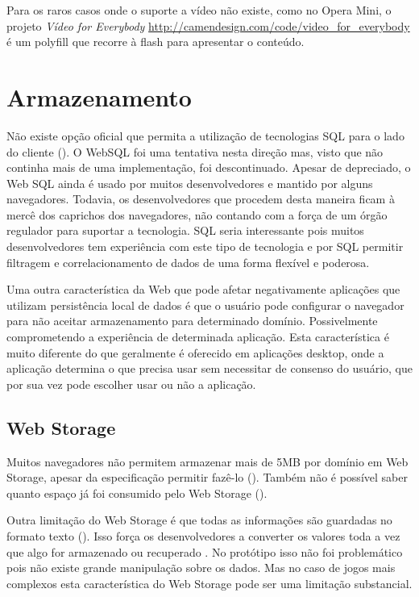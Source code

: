 Para os raros casos onde o suporte a vídeo não existe,
como no Opera Mini, o projeto \textit{Vídeo for Everybody}
\url{http://camendesign.com/code/video_for_everybody} é um polyfill que
recorre à flash para apresentar o conteúdo.

\section{Armazenamento}

Não existe opção oficial que permita a utilização de tecnologias
SQL para o lado do cliente (). O WebSQL foi uma
tentativa nesta direção mas, visto que não continha mais de uma
implementação, foi descontinuado. Apesar de depreciado, o Web SQL ainda
é usado por muitos desenvolvedores e mantido por alguns navegadores.
Todavia, os desenvolvedores que procedem desta maneira ficam à mercê
dos caprichos dos navegadores, não contando com a força de um
órgão regulador para suportar a tecnologia. SQL seria interessante pois
muitos desenvolvedores tem experiência com este tipo de tecnologia e
por SQL permitir filtragem e correlacionamento de dados de uma forma
flexível e poderosa.

Uma outra característica da Web que pode afetar negativamente
aplicações que utilizam  persistência local de dados é que o
usuário pode configurar o navegador para não aceitar armazenamento
para determinado domínio. Possivelmente comprometendo a experiência
de determinada aplicação. Esta característica é muito diferente do
que geralmente é oferecido em aplicações desktop, onde a aplicação
determina o que precisa usar sem necessitar de consenso do usuário, que
por sua vez pode escolher usar ou não a aplicação.

\subsection{Web Storage}

Muitos navegadores não permitem armazenar mais de 5MB por domínio
em Web Storage, apesar da especificação permitir fazê-lo
\autocite{gameAssetManagement} (). Também
não é possível saber quanto espaço já foi consumido pelo Web
Storage ().

Outra limitação do Web Storage é que todas as informações são
guardadas no formato texto (). Isso
força os desenvolvedores a converter os valores toda a vez que algo for
armazenado ou recuperado \autocite{gameAssetManagement}. No protótipo
isso não foi problemático pois não existe grande manipulação sobre
os dados. Mas no caso de jogos mais complexos esta característica do
Web Storage pode ser uma limitação substancial.

